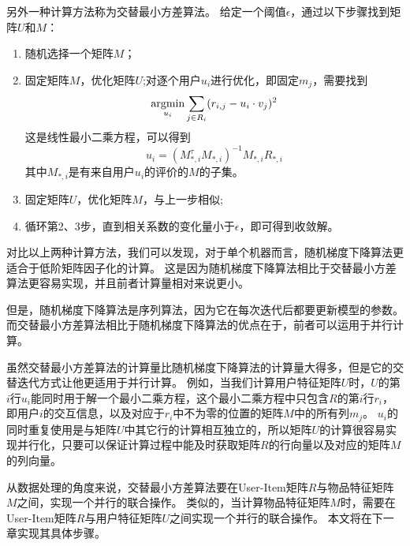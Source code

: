 另外一种计算方法称为交替最小方差算法。
给定一个阈值$\epsilon$，通过以下步骤找到矩阵$U$和$M$：
\begin{enumerate}
	\item 随机选择一个矩阵$M$；
	\item 固定矩阵$M$，优化矩阵$U$;对逐个用户$u_i$进行优化，即固定$m_j$，需要找到
	\begin{equation}
	\mathop{\operatorname*{argmin}}_{u_i} \sum_{j\in R_i}(r_{i,j}-u_i\cdot v_j)^2
	\end{equation}
	这是线性最小二乘方程，可以得到
	\begin{equation}
	u_i=(M_{*,i}^{\tau}M_{*,i})^{-1}M_{*,i}R_{*,i}
	\end{equation}
	其中$M_{*,i}$是有来自用户$u_i$的评价的$M$的子集。
	\item 固定矩阵$U$，优化矩阵$M$，与上一步相似;
	\item 循环第2、3步，直到相关系数的变化量小于$\epsilon$，即可得到收敛解。
\end{enumerate}

对比以上两种计算方法，我们可以发现，对于单个机器而言，随机梯度下降算法更适合于低阶矩阵因子化的计算。
这是因为随机梯度下降算法相比于交替最小方差算法更容易实现，并且前者计算量相对来说更小。

但是，随机梯度下降算法是序列算法，因为它在每次迭代后都要更新模型的参数。
而交替最小方差算法相比于随机梯度下降算法的优点在于，前者可以运用于并行计算。

虽然交替最小方差算法的计算量比随机梯度下降算法的计算量大得多，但是它的交替迭代方式让他更适用于并行计算。
例如，当我们计算用户特征矩阵$U$时，$U$的第$i$行$u_i$能同时用于解一个最小二乘方程，这个最小二乘方程中只包含$R$的第$i$行$r_i$，即用户$i$的交互信息，以及对应于$r_i$中不为零的位置的矩阵$M$中的所有列$m_j$。
$u_i$的同时重复使用是与矩阵$U$中其它行的计算相互独立的，所以矩阵$U$的计算很容易实现并行化，只要可以保证计算过程中能及时获取矩阵$R$的行向量以及对应的矩阵$M$的列向量。

从数据处理的角度来说，交替最小方差算法要在User-Item矩阵$R$与物品特征矩阵$M$之间，实现一个并行的联合操作。
类似的，当计算物品特征矩阵$M$时，需要在User-Item矩阵$R$与用户特征矩阵$U$之间实现一个并行的联合操作。
本文将在下一章实现其具体步骤。







